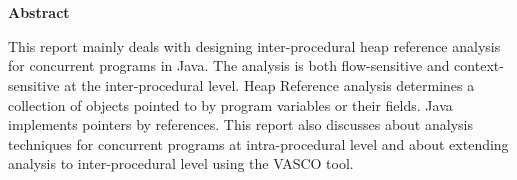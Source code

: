 \chapter*{}
\begin{center}
\textbf{Abstract}
\end{center}


This report mainly deals with designing inter-procedural heap reference analysis for concurrent programs in Java. The analysis is both flow-sensitive and context-sensitive at the inter-procedural level. Heap Reference analysis determines a collection of objects pointed to by program variables or their fields. Java implements pointers by references. This report also discusses about analysis techniques for concurrent programs at intra-procedural level and about extending analysis to inter-procedural level using the VASCO tool.   

